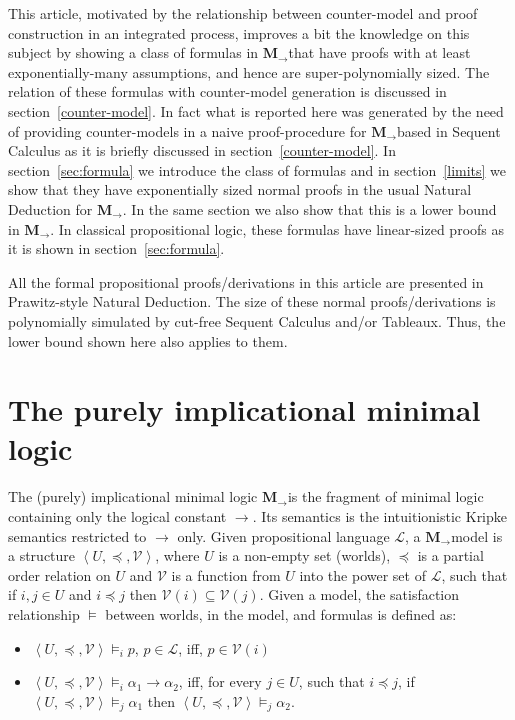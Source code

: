 \documentclass[11pt]{llncs}
\newcommand{\imply}{\ensuremath{\rightarrow}}
\newcommand{\mil}{\ensuremath{\mathbf{M}_{\rightarrow}}}
\begin{document}
This article, motivated by the relationship between counter-model and proof construction in an integrated process,  improves a bit the knowledge on this subject by showing  a class of formulas in \mil that have proofs with at least exponentially-many assumptions, and hence are super-polynomially sized. The relation of these formulas with counter-model generation is discussed in section~\ref{counter-model}. In fact what is reported here was generated by the need of providing counter-models in a naive proof-procedure  for \mil based in Sequent Calculus as it is briefly discussed in section~\ref{counter-model}. In section~\ref{sec:formula} we introduce the class of formulas and in section~\ref{limits} we show  that  
they have exponentially sized normal proofs in the usual Natural Deduction for \mil. In the same section we also show that this is a lower bound in \mil. In classical propositional logic, these formulas have linear-sized proofs as it is shown in section~\ref{sec:formula}.

 All the formal propositional proofs/derivations in this article are presented in Prawitz-style Natural Deduction. The size of these normal proofs/derivations is polynomially simulated by cut-free Sequent Calculus and/or Tableaux. Thus, the lower bound shown here also applies to them.   



\section{The purely implicational minimal logic}

The (purely) implicational minimal logic \mil is the fragment of minimal logic containing only the logical constant $\imply$. Its semantics is the intuitionistic Kripke semantics restricted to $\imply$ only. Given propositional language $\mathcal{L}$, a \mil model is a structure $\left< U,\preceq, \mathcal{V} \right>$, where $U$ is a non-empty set (worlds), $\preceq$ is a partial order relation on $U$ and $\mathcal{V}$ is a function from $U$ into the power set of $\mathcal{L}$, such that if $i,j\in U$ and $i\preceq j$ then $\mathcal{V}(i)\subseteq\mathcal{V}(j)$. Given a model, the satisfaction relationship $\models$ between worlds, in the model,  and formulas is defined as:
\begin{itemize}
\item $\left< U,\preceq, \mathcal{V} \right>\models_{i}p$, $p\in\mathcal{L}$, iff, $p\in\mathcal{V}(i)$
\item $\left< U,\preceq, \mathcal{V} \right>\models_{i}\alpha_1\imply\alpha_2$, iff, for every $j\in U$, such that $i\preceq j$, if $\left< U,\preceq, \mathcal{V} \right>\models_{j}\alpha_1$ then $\left< U,\preceq, \mathcal{V} \right>\models_{j}\alpha_2$.
\end{itemize}
\end{document}
